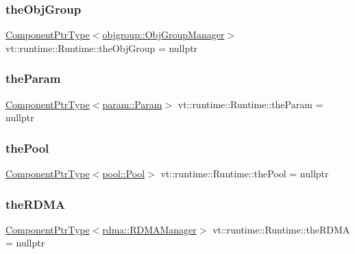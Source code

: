 \subsubsection{\texorpdfstring{the\+Obj\+Group}{theObjGroup}}
{\footnotesize\ttfamily \hyperlink{structvt_1_1runtime_1_1_runtime_a0893bf0a8c03b898e8ab66b52cec80ad}{Component\+Ptr\+Type}$<$\hyperlink{structvt_1_1objgroup_1_1_obj_group_manager}{objgroup\+::\+Obj\+Group\+Manager}$>$ vt\+::runtime\+::\+Runtime\+::the\+Obj\+Group = nullptr}

\mbox{\label{structvt_1_1runtime_1_1_runtime_a3001881d47dc04ed4e77a1e183dd970e}} 
\subsubsection{\texorpdfstring{the\+Param}{theParam}}
{\footnotesize\ttfamily \hyperlink{structvt_1_1runtime_1_1_runtime_a0893bf0a8c03b898e8ab66b52cec80ad}{Component\+Ptr\+Type}$<$\hyperlink{structvt_1_1param_1_1_param}{param\+::\+Param}$>$ vt\+::runtime\+::\+Runtime\+::the\+Param = nullptr}

\mbox{\label{structvt_1_1runtime_1_1_runtime_a060aca8399f1c6499c4676a26db2e39e}} 
\subsubsection{\texorpdfstring{the\+Pool}{thePool}}
{\footnotesize\ttfamily \hyperlink{structvt_1_1runtime_1_1_runtime_a0893bf0a8c03b898e8ab66b52cec80ad}{Component\+Ptr\+Type}$<$\hyperlink{structvt_1_1pool_1_1_pool}{pool\+::\+Pool}$>$ vt\+::runtime\+::\+Runtime\+::the\+Pool = nullptr}

\mbox{\label{structvt_1_1runtime_1_1_runtime_ab8ec604b336a974682b0fec124a4a31b}} 
\subsubsection{\texorpdfstring{the\+R\+D\+MA}{theRDMA}}
{\footnotesize\ttfamily \hyperlink{structvt_1_1runtime_1_1_runtime_a0893bf0a8c03b898e8ab66b52cec80ad}{Component\+Ptr\+Type}$<$\hyperlink{structvt_1_1rdma_1_1_r_d_m_a_manager}{rdma\+::\+R\+D\+M\+A\+Manager}$>$ vt\+::runtime\+::\+Runtime\+::the\+R\+D\+MA = nullptr}

